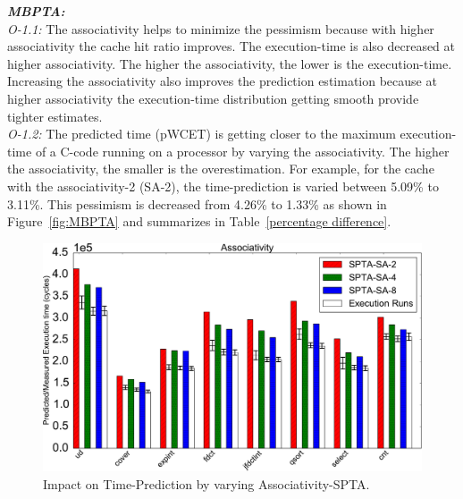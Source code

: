 \textit{\textbf{MBPTA:}}\\
\textit{O-1.1:} The associativity helps to minimize the pessimism because with higher associativity the cache hit ratio improves. The execution-time is also decreased at higher associativity. The higher the associativity, the lower is the  execution-time. Increasing the associativity also improves the prediction estimation because at higher associativity the execution-time distribution getting smooth provide tighter estimates. \\
\textit{O-1.2:} The predicted time (pWCET) is getting closer to the maximum execution-time of a C-code running on a processor by varying the associativity. The higher the associativity, the smaller is the overestimation. For example, for the cache with the associativity-2 (SA-2), the time-prediction is varied between 5.09\% to 3.11\%. This pessimism is decreased from 4.26\% to 1.33\% as shown in Figure~\ref{fig:MBPTA} and summarizes in Table~\ref{percentage difference}. 

\begin{figure}[tb!]
\centering
\includegraphics[scale=0.4]{figures/spta.pdf}
\caption{Impact on Time-Prediction by varying Associativity-SPTA.}
\label{fig:SPTA}
\end{figure}

